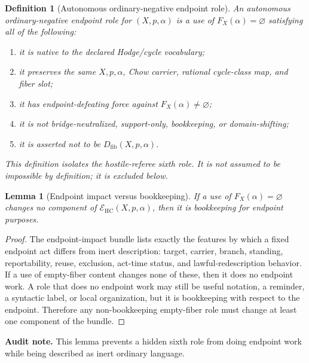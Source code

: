 \documentclass[11pt]{article}
\newtheorem{lemma}[theorem]{Lemma}
\newtheorem{definition}[theorem]{Definition}
\newcommand{\HC}{\operatorname{HC}}
\begin{document}
\begin{definition}[Autonomous ordinary-negative endpoint role]
An autonomous ordinary-negative endpoint role for $(X,p,\alpha)$ is a use of $F_X(\alpha)=\varnothing$ satisfying all of the following:
\begin{enumerate}
\item it is native to the declared Hodge/cycle vocabulary;
\item it preserves the same $X,p,\alpha$, Chow carrier, rational cycle-class map, and fiber slot;
\item it has endpoint-defeating force against $F_X(\alpha)\neq\varnothing$;
\item it is not bridge-neutralized, support-only, bookkeeping, or domain-shifting;
\item it is asserted not to be $D_{\mathrm{fib}}(X,p,\alpha)$.
\end{enumerate}
This definition isolates the hostile-referee sixth role. It is not assumed to be impossible by definition; it is excluded below.
\end{definition}

\begin{lemma}[Endpoint impact versus bookkeeping]
If a use of $F_X(\alpha)=\varnothing$ changes no component of $\mathcal E_{\HC}(X,p,\alpha)$, then it is bookkeeping for endpoint purposes.
\end{lemma}
\begin{proof}
The endpoint-impact bundle lists exactly the features by which a fixed endpoint act differs from inert description: target, carrier, branch, standing, reportability, reuse, exclusion, act-time status, and lawful-redescription behavior. If a use of empty-fiber content changes none of these, then it does no endpoint work. A role that does no endpoint work may still be useful notation, a reminder, a syntactic label, or local organization, but it is bookkeeping with respect to the endpoint. Therefore any non-bookkeeping empty-fiber role must change at least one component of the bundle.
\end{proof}
\par\noindent\textbf{Audit note.} This lemma prevents a hidden sixth role from doing endpoint work while being described as inert ordinary language.
\end{document}
